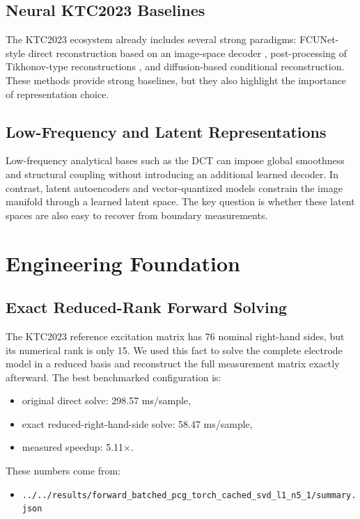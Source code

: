 \documentclass[11pt,a4paper]{article}
\begin{document}
\subsection{Neural KTC2023 Baselines}
The KTC2023 ecosystem already includes several strong paradigms: FCUNet-style direct reconstruction based on an image-space decoder \cite{chen2020deep}, post-processing of Tikhonov-type reconstructions \cite{martin2017post}, and diffusion-based conditional reconstruction. These methods provide strong baselines, but they also highlight the importance of representation choice.

\subsection{Low-Frequency and Latent Representations}
Low-frequency analytical bases such as the DCT \cite{ahmed1974dct} can impose global smoothness and structural coupling without introducing an additional learned decoder. In contrast, latent autoencoders and vector-quantized models \cite{oord2017vqvae} constrain the image manifold through a learned latent space. The key question is whether these latent spaces are also easy to recover from boundary measurements.

\section{Engineering Foundation}
\subsection{Exact Reduced-Rank Forward Solving}
The KTC2023 reference excitation matrix has 76 nominal right-hand sides, but its numerical rank is only 15. We used this fact to solve the complete electrode model in a reduced basis and reconstruct the full measurement matrix exactly afterward. The best benchmarked configuration is:
\begin{itemize}[leftmargin=1.5em]
    \item original direct solve: 298.57 ms/sample,
    \item exact reduced-right-hand-side solve: 58.47 ms/sample,
    \item measured speedup: 5.11$\times$.
\end{itemize}

These numbers come from:
\begin{itemize}[leftmargin=1.5em]
    \item \texttt{../../results/forward\_batched\_pcg\_torch\_cached\_svd\_l1\_n5\_1/summary.json}
\end{itemize}
\end{document}
